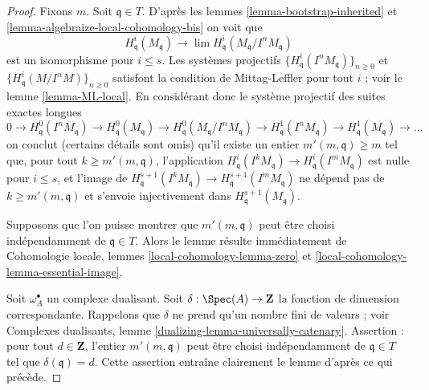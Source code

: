 \begin{proof}
Fixons $m$. Soit $\mathfrak q \in T$.
D'après les lemmes \ref{lemma-bootstrap-inherited} et
\ref{lemma-algebraize-local-cohomology-bis}
on voit que
$$
H^i_\mathfrak q(M_\mathfrak q)
\longrightarrow
\lim H^i_\mathfrak q(M_\mathfrak q/I^nM_\mathfrak q)
$$
est un isomorphisme pour $i \leq s$. Les systèmes projectifs
$\{H^i_\mathfrak q(I^nM_\mathfrak q)\}_{n \geq 0}$ et
$\{H^i_\mathfrak q(M/I^nM)\}_{n \geq 0}$
satisfont la condition de Mittag-Leffler pour tout $i$ ; voir le
lemme \ref{lemma-ML-local}. En considérant donc le système projectif des
suites exactes longues
$$
0 \to H^0_\mathfrak q(I^nM_\mathfrak q) \to
H^0_\mathfrak q(M_\mathfrak q) \to
H^0_\mathfrak q(M_\mathfrak q/I^nM_\mathfrak q) \to
H^1_\mathfrak q(I^nM_\mathfrak q) \to
H^1_\mathfrak q(M_\mathfrak q) \to \ldots
$$
on conclut (certains détails sont omis) qu'il existe un entier
$m'(m, \mathfrak q) \geq m$ tel que, pour tout $k \geq m'(m, \mathfrak q)$,
l'application
$H^i_\mathfrak q(I^kM_\mathfrak q) \to H^i_\mathfrak q(I^mM_\mathfrak q)$
est nulle pour $i \leq s$, et l'image de
$H^{s + 1}_\mathfrak q(I^kM_\mathfrak q) \to
H^{s + 1}_\mathfrak q(I^mM_\mathfrak q)$
ne dépend pas de $k \geq m'(m, \mathfrak q)$ et
s'envoie injectivement dans $H^{s + 1}_\mathfrak q(M_\mathfrak q)$.

\medskip\noindent
Supposons que l'on puisse montrer que $m'(m, \mathfrak q)$ peut être choisi
indépendamment de $\mathfrak q \in T$.
Alors le lemme résulte immédiatement de
Cohomologie locale, lemmes \ref{local-cohomology-lemma-zero} et
\ref{local-cohomology-lemma-essential-image}.

\medskip\noindent
Soit $\omega_A^\bullet$ un complexe dualisant. Soit
$\delta : \Spec(A) \to \mathbf{Z}$ la fonction de dimension
correspondante. Rappelons que $\delta$ ne prend qu'un
nombre fini de valeurs ; voir
Complexes dualisants, lemme \ref{dualizing-lemma-universally-catenary}.
Assertion : pour tout $d \in \mathbf{Z}$, l'entier
$m'(m, \mathfrak q)$ peut être choisi indépendamment
de $\mathfrak q \in T$ tel que $\delta(\mathfrak q) = d$.
Cette assertion entraîne clairement le lemme d'après ce qui précède.


\end{proof}
